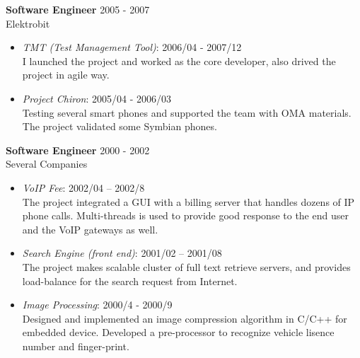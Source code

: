 \textbf{Software Engineer} \hfill 2005 - 2007 \\
        Elektrobit
        \begin{itemize}  \itemsep -2pt %
            \item {\em TMT (Test Management Tool)}: 2006/04 - 2007/12 \\ 
            I launched the project and worked as the core developer, also drived 
            the project in agile way.
            \item {\em Project Chiron}: 2005/04 - 2006/03 \\
                Testing several smart phones and supported the team with OMA materials.
                The project validated some Symbian phones.
        \end{itemize}
 
\textbf{Software Engineer} \hfill 2000 - 2002 \\
        Several Companies
        \begin{itemize}  \itemsep -2pt %
            \item {\em VoIP Fee}: 2002/04 – 2002/8 \\ 
            The project integrated a GUI with a billing server
            that handles dozens of IP phone calls.
            Multi-threads is used to provide good response to the end user and the VoIP gateways as well.
            \item {\em Search Engine (front end)}:  2001/02 -- 2001/08 \\
                The project makes scalable cluster of full text retrieve servers,
            and provides load-balance for the search request from Internet. 
            \item {\em Image Processing}: 2000/4 - 2000/9\\
                Designed and implemented an image compression algorithm in C/C++ for embedded device.
                Developed a pre-processor to recognize vehicle lisence number and finger-print.
        \end{itemize}
